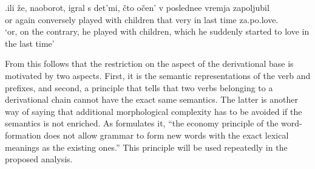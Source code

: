 \exg.\label{ex:zapoljubit}ili \v{z}e, naoborot, igral s det'mi, \v{c}to o\v{c}en' v poslednee vremja zapoljubil\\
or again conversely played with children that very in last time za.po.love.\\
\trans `or, on the contrary, he played with children, which he suddenly started to love in the last time'

From this follows that the restriction on the aspect of the derivational base is motivated by two aspects. First, it is the semantic representations of the verb and prefixes, and second, a principle that tells that two verbs belonging to a derivational chain cannot have the exact same semantics. The latter is another way of saying that additional morphological complexity has to be avoided if the semantics is not enriched. As \citet{Braginsky:08} formulates it, ``the economy principle of the word-formation does not allow grammar to form new words with the
exact lexical meanings as the existing ones.'' This principle will be used repeatedly in the proposed analysis.


